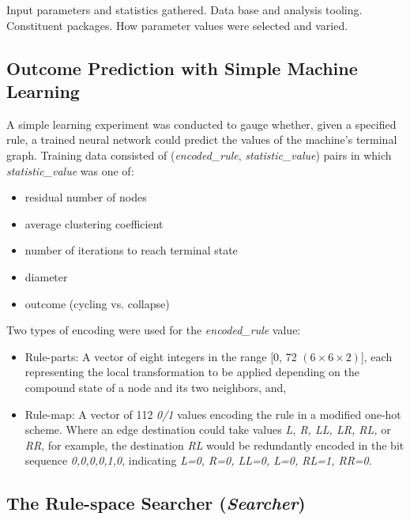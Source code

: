 \documentclass{tufte-handout}
\begin{document}
Input parameters and statistics gathered. Data base and analysis tooling.
Constituent packages. How parameter values were selected and varied.

\subsection{Outcome Prediction with Simple Machine Learning}

A simple learning experiment was conducted to gauge whether, given a
specified rule, a trained neural network could predict the values of
the machine's terminal graph. Training data consisted of
(\textit{encoded\_rule}, \textit{statistic\_value}) pairs in which
\textit{statistic\_value} was one of:

\vspace{1mm}
\begin{itemize}
\setlength{\itemindent}{2em}
    \item residual number of nodes
    \item average clustering coefficient
    \item number of iterations to reach terminal state
    \item diameter
    \item outcome (cycling vs. collapse)
\end{itemize}
\vspace{2mm}
Two types of encoding were used for the \textit{encoded\_rule} value:

\vspace{1mm}
\begin{itemize}
\setlength{\itemindent}{2em}
    \item Rule-parts: A vector of eight integers in the range
    [0, 72 $(6 \times 6 \times 2)$], each representing the local transformation
    to be applied depending on the compound state of a node and its
    two neighbors, and,
    \item Rule-map: A vector of 112 \textit{0/1} values encoding the rule in
    a modified one-hot scheme. Where an edge destination could take values
    \textit{L, R, LL, LR, RL,} or \textit{RR}, for example, the destination
    \textit{RL} would be redundantly encoded in the bit sequence
    \textit{0,0,0,0,1,0}, indicating \textit{L=0, R=0, LL=0, L=0, RL=1, RR=0}.
\end{itemize}
\vspace{2mm}

\subsection{The Rule-space Searcher (\textit{Searcher})}
\end{document}
